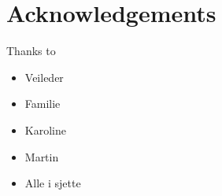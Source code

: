 \chapter{Acknowledgements}

Thanks to
\begin{itemize}
	\item Veileder
	\item Familie
	\item Karoline
	\item Martin
	\item Alle i sjette
\end{itemize}
